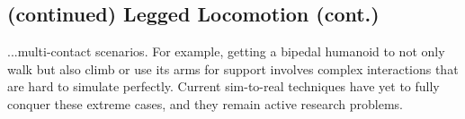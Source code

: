 \subsection{(continued) Legged Locomotion (cont.)}
...multi-contact scenarios. For example, getting a bipedal humanoid to not only walk but also climb or use its arms for support involves complex interactions that are hard to simulate perfectly. Current sim-to-real techniques have yet to fully conquer these extreme cases, and they remain active research problems.